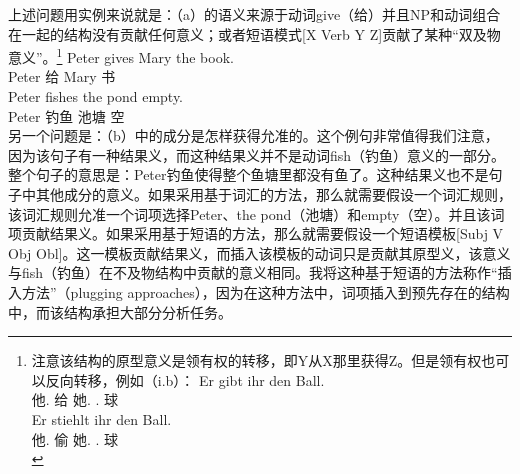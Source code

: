 上述问题用实例来说就是：（a）的语义来源于动词give（给）并且NP和动词组合在一起的结构没有贡献任何意义；或者短语模式[X Verb Y Z]贡献了某种“双及物意义”。\footnote{%
注意该结构的原型意义是领有权的转移，即Y从X那里获得Z。但是领有权也可以反向转移，例如（i.b）：
\eal
\ex 
\gll Er gibt ihr den Ball.\\
     他.\nom{} 给 她.\dat{} .\acc{} 球\\
\ex
\gll Er stiehlt ihr den Ball.\\
     他.\nom{} 偷  她.\dat{} .\acc{} 球\\
\zllast
}
\eal
\ex 
\gll Peter gives Mary the book.\\
      Peter 给 Mary  书\\
\ex 
\gll Peter fishes the pond empty.\\
Peter 钓鱼  池塘 空\\
\zl
另一个问题是：（b）中的成分是怎样获得允准的。这个例句非常值得我们注意，因为该句子有一种结果义，而这种结果义并不是动词fish（钓鱼）意义的一部分。整个句子的意思是：Peter钓鱼使得整个鱼塘里都没有鱼了。这种结果义也不是句子中其他成分的意义。如果采用基于词汇的方法，那么就需要假设一个词汇规则，该词汇规则允准一个词项选择Peter、the pond（池塘）和empty（空）。并且该词项贡献结果义。如果采用基于短语的方法，那么就需要假设一个短语模板[Subj V Obj Obl]。这一模板贡献结果义，而插入该模板的动词只是贡献其原型义，该意义与fish（钓鱼）在不及物结构中贡献的意义相同。我将这种基于短语的方法称作“插入方法”（plugging approaches），因为在这种方法中，词项插入到预先存在的结构中，而该结构承担大部分分析任务。
